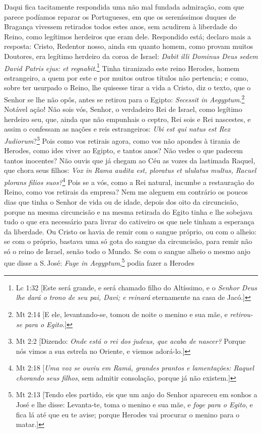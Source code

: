 Daqui fica tacitamente respondida uma não mal fundada admiração, com que
parece podíamos reparar os Portugueses, em que os sereníssimos duques de
Bragança vivessem retirados todos estes anos, sem acudirem à liberdade
do Reino, como legítimos herdeiros que eram dele. Respondido está;
declaro mais a resposta: Cristo, Redentor nosso, ainda em quanto homem,
como provam muitos Doutores, era legítimo herdeiro da coroa de Israel:
\emph{Dabit illi Dominus Deus sedem David Patris ejus: et regnabit}.\footnote{Lc 1:32 [Este será grande, e será chamado filho do Altíssimo, e o \textit{Senhor Deus lhe dará o trono de seu pai, Davi; e reinará} eternamente na casa de Jacó.]}
Tinha tiranizado este reino Herodes, homem estrangeiro, a quem por este
e por muitos outros títulos não pertencia; e como, sobre ter usurpado o
Reino, lhe quisesse tirar a vida a Cristo, diz o texto, que o Senhor se
lhe não opôs, antes se retirou para o Egipto: \emph{Secessit in
Aegyptum}.\footnote{Mt 2:14 [E ele, levantando-se, tomou de noite o menino e sua mãe, e \textit{retirou-se para o Egito.}]} Notável ação! Não sois vós, Senhor, o verdadeiro Rei de
Israel, como legítimo herdeiro seu, que, ainda que não empunhais o
ceptro, Rei sois e Rei nascestes, e assim o confessam as nações e reis
estrangeiros: \emph{Ubi est qui natus est Rex Judiorum}?\footnote{Mt 2:2 [Dizendo: \textit{Onde está o rei dos judeus, que acaba de nascer?} Porque nós vimos a sua estrela no Oriente, e viemos adorá-lo.]} Pois como vos
retirais agora, como vos não apondes à tirania de Herodes, como ides
viver ao Egipto, e tantos anos? Não vedes o que padecem tantos
inocentes? Não ouvis que já chegam ao Céu as vozes da lastimada Raquel,
que chora seus filhos: \emph{Vox in Rama audita est, ploratus et
ululatus multus, Racuel plorans filios suos?}\footnote{Mt 2:18 [\textit{Uma voz se ouviu em Ramá, grandes prantos e lamentações: Raquel chorando seus filhos}, sem admitir consolação, porque já não existem.]} Pois se a vós, como a Rei
natural, incumbe a restauração do Reino, como vos retirais da empresa?
Nem me aleguem em contrário os poucos dias que tinha o Senhor de vida ou de
idade, depois dos oito da circuncisão, porque na mesma circuncisão e na
mesma retirada do Egito tinha e lhe sobejava tudo o que era necessário
para livrar do cativeiro os que nele tinham a esperança da liberdade. Ou
Cristo os havia de remir com o sangue próprio, ou com o alheio: se com o
próprio, bastava uma só gota do sangue da circuncisão, para remir não só
o reino de Israel, senão todo o Mundo. Se com o sangue alheio o mesmo
anjo que disse a S.\,José: \emph{Fuge in Aegyptum},\footnote{Mt 2:13 [Tendo eles partido, eis que um anjo do Senhor apareceu em sonhos a José e lhe disse: Levanta-te, toma o menino e sua mãe, e \textit{foge para o Egito}, e fica lá até que eu te avise; porque Herodes vai procurar o menino para o matar.]} podia fazer a Herodes
